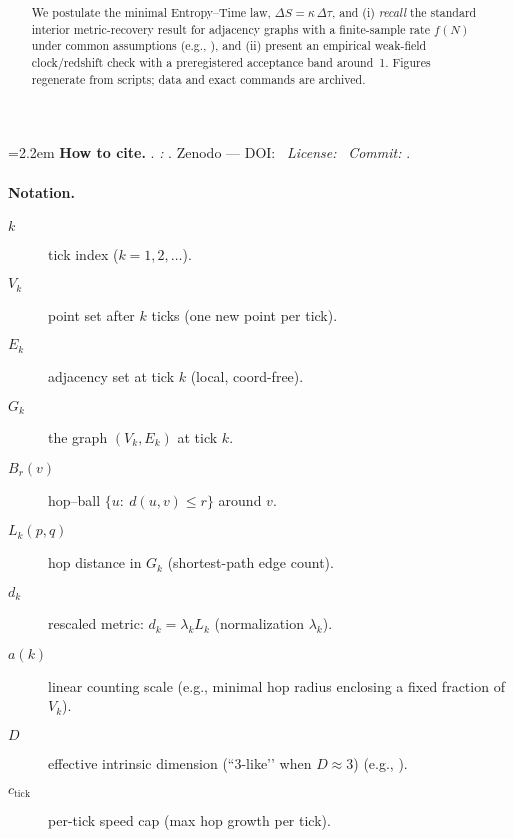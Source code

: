 \documentclass[11pt,a4paper]{article}
\title{\PaperTitleMain\\[2pt]
\large \texorpdfstring{\PaperSubtitleMath}{Delta S = k Delta tau}}
\author{\AuthorName}
\date{\PaperVersion}
\begin{document}
\maketitle

\noindent\begingroup
\setlength{\emergencystretch}{12em}\sloppy\raggedright
\hangindent=2.2em 
\textbf{How to cite.}\enspace
\AuthorNameShort. \emph{\PaperTitleMain:} \texorpdfstring{\PaperSubtitleMath}{Delta S = k Delta tau}. \PaperVersion
Zenodo — DOI: \RepoDOIlink \textbullet\ \textit{License:} \PaperLicense \textbullet\ \textit{Commit:} \RepoCommit.
\par\endgroup

\begin{abstract}
We postulate the minimal Entropy--Time law, $\Delta S=\kappa\,\Delta\tau$, and (i) \emph{recall} the standard interior metric-recovery result for adjacency graphs with a finite-sample rate $f(N)$ under common assumptions (e.g., \cite{Tenenbaum2000,lovasz1993random}), and (ii) present an empirical weak-field clock/redshift check with a preregistered acceptance band around~1. Figures regenerate from scripts; data and exact commands are archived.
\end{abstract}

\paragraph{Notation.}
\begin{description}
  \item[$k$] tick index ($k=1,2,\dots$).
  \item[$V_k$] point set after $k$ ticks (one new point per tick).
  \item[$E_k$] adjacency set at tick $k$ (local, coord-free).
  \item[$G_k$] the graph $(V_k,E_k)$ at tick $k$.
  \item[$B_r(v)$] hop–ball $\{u:\ d(u,v)\le r\}$ around $v$.
  \item[$L_k(p,q)$] hop distance in $G_k$ (shortest-path edge count).
  \item[$d_k$] rescaled metric: $d_k=\lambda_k L_k$ (normalization $\lambda_k$).
  \item[$a(k)$] linear counting scale (e.g., minimal hop radius enclosing a fixed fraction of $V_k$).
  \item[$D$] effective intrinsic dimension (“3-like’’ when $D\approx 3$) (e.g., \cite{falconer2014fractal,grassberger1983measuring}).
  \item[$c_{\text{tick}}$] per-tick speed cap (max hop growth per tick).
\end{description}
\end{document}
